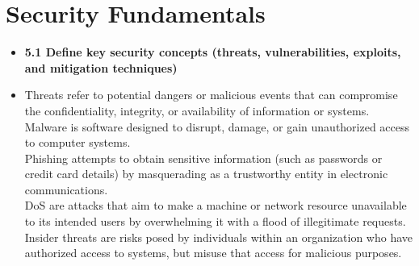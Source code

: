\documentclass{article}
\begin{document}
\section{Security Fundamentals}
\begin{itemize}
  \item \textbf{5.1 Define key security concepts (threats, vulnerabilities, exploits, and mitigation techniques)}
  	\item[] Threats refer to potential dangers or malicious events that can compromise the confidentiality, integrity, or availability of information or systems.\\
	Malware is software designed to disrupt, damage, or gain unauthorized access to computer systems.\\
	Phishing attempts to obtain sensitive information (such as passwords or credit card details) by masquerading as a trustworthy entity in electronic communications.\\
	DoS are attacks that aim to make a machine or network resource unavailable to its intended users by overwhelming it with a flood of illegitimate requests.\\
	Insider threats are risks posed by individuals within an organization who have authorized access to systems, but misuse that access for malicious purposes.\\

\end{itemize}
\end{document}
